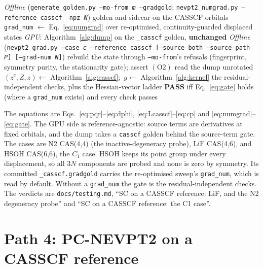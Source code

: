 \documentclass[11pt]{article}
\newcommand{\code}[1]{\texttt{#1}}
\newcommand{\cons}[1]{\ensuremath{(\mathrm{#1})}}
\begin{document}
\begin{algorithm}[htbp]
\caption{Path 3, SC on CASSCF orbitals}
\label{alg:path3}
\begin{algorithmic}[1]
\Statex \textit{Offline} (\code{generate\_golden.py --mo-from \textit{m} --gradgold}; \code{nevpt2\_numgrad.py --reference casscf --npz \textit{N}})
\State golden and sidecar on the CASSCF orbitals
\State \code{grad\_num} $\gets$ Eq.~\eqref{eq:numgrad} over re-optimised, continuity-guarded displaced states
\Statex \textit{GPU}: Algorithm~\ref{alg:dump} on the \code{\_casscf} golden, \textbf{unchanged}
\Statex \textit{Offline} (\code{nevpt2\_grad.py --case \textit{c} --reference casscf [--source both --source-path \textit{P}] [--grad-num \textit{N}]})
\State rebuild the state through \code{--mo-from}'s refusals (fingerprint, symmetry purity, the stationarity gate); assert \cons{O2}
\State read the dump unrotated 
\State $(z^c, Z, z) \gets$ Algorithm~\ref{alg:casscf};\ $g \gets$ Algorithm~\ref{alg:kernel}
\State the residual-independent checks, plus the Hessian-vector ladder \Comment{\S\ref{sec:checks}}
\State \textbf{PASS} iff Eq.~\eqref{eq:gate} holds (where a \code{grad\_num} exists) and every check passes
\end{algorithmic}
\end{algorithm}

The equations are Eqs.~\eqref{eq:pqr}--\eqref{eq:dphi},
\eqref{eq:Lcasscf}--\eqref{eq:cp} and \eqref{eq:numgrad}--\eqref{eq:gate}. The
GPU side is reference-agnostic: source terms are derivatives at fixed
orbitals, and the dump takes a \code{casscf} golden behind the source-term gate.
The cases are N2 CAS(4,4) (the inactive-degeneracy probe), LiF CAS(4,6), and
HSOH CAS(6,6), the $C_1$ case. HSOH keeps its point group under every
displacement, so all $3N$ components are probed and none is zero by symmetry.
Its committed \code{\_casscf.gradgold} carries the re-optimised sweep's
\code{grad\_num}, which is read by default. Without a \code{grad\_num} the gate
is the residual-independent checks. The verdicts are \code{docs/testing.md},
``SC on a CASSCF reference: LiF, and the N2 degeneracy probe'' and ``SC on a
CASSCF reference: the C1 case''.

\section{Path 4: PC-NEVPT2 on a CASSCF reference}
\label{sec:pc-casscf}
\end{document}
